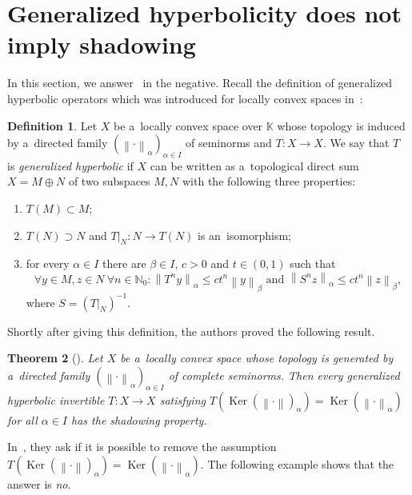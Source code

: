 \documentclass[11pt,a4paper]{amsart}
\newtheorem{theorem}{Theorem}[section]
\theoremstyle{definition}
\newtheorem{definition}[theorem]{Definition}
\newcommand{\N}{\mathbb{N}}
\newcommand{\K}{\mathbb{K}}
\newcommand{\norm}[1]{\left\| #1 \right\|}
\renewcommand{\ker}{\operatorname{Ker}}
\begin{document}
	
	\section{Generalized hyperbolicity does not imply shadowing} \label{sect:GenHypAndShadowing}
	
	In this section, we answer~\cite[Problem~C]{Darji} in the negative. Recall the definition of generalized hyperbolic operators which was introduced for locally convex spaces in~\cite{Darji}:
	\begin{definition}
		Let $X$ be a~locally convex space over $\K$ whose topology is induced by a~directed family $(\norm{\cdot}_\alpha)_{\alpha \in I}$ of seminorms and $T: X \to X$. We say that $T$ is \emph{generalized hyperbolic} if $X$ can be written as a~topological direct sum $X = M \oplus N$ of two subspaces $M, N$ with the following three properties:
		\begin{enumerate}
			\item $T(M) \subset M$;
			\item $T(N) \supset N$ and $T|_N: N \to T(N)$ is an~isomorphism;
			\item for every $\alpha \in I$ there are $\beta \in I$, $c > 0$ and $t \in (0,1)$ such that
			\begin{equation*}
				\forall y \in M, z \in N \ \forall n \in \N_0 \colon \norm{T^n y}_\alpha \leq ct^n \norm{y}_\beta \text{ and } \norm{S^n z}_\alpha \leq ct^n\norm{z}_\beta,
			\end{equation*}
			where $S = (T|_N)^{-1}$.
		\end{enumerate}
	\end{definition}
	
	Shortly after giving this definition, the authors proved the following result.
	\begin{theorem}[{\cite[Theorem~6]{Darji}}]
		Let $X$ be a~locally convex space whose topology is generated by a~directed family $(\norm{\cdot}_\alpha)_{\alpha \in I}$ of complete seminorms. Then every generalized hyperbolic invertible $T: X \to X$ satisfying $T(\ker(\norm{\cdot})_\alpha) = \ker(\norm{\cdot}_\alpha)$ for all $\alpha \in I$ has the shadowing property.
	\end{theorem}
	
	In~\cite[Problem~C]{Darji}, they ask if it is possible to remove the assumption $T(\ker(\norm{\cdot})_\alpha) = \ker(\norm{\cdot}_\alpha)$. The following example shows that the answer is \emph{no}.
	
\end{document}
